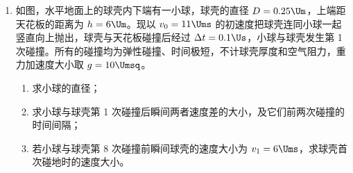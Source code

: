 \documentclass[\gkver]{gaokaozhenti}
\begin{document}
\begin{enumerate}
{离子进入反射电场，沿电场方向分速度 $v_{\parallel}=v\cos\theta$

加速度大小 $a=\frac{qU_{2}}{md_{2}}$

离子在反射电场中垂直电场方向分速度 $v_{\perp}=v\sin\theta$

由于 $U_{2}>U_{1}$，则粒子在反射电场往返时间 $t_{3}=\frac{2v_{\parallel}}{a}=\frac{2d_{2}\cos\theta}{U_{2}}\sqrt{\frac{2mU_{1}}{q}}$

可得垂直电场方向位移 $y=v_{\perp}t_{3}=\frac{4U_{1}d_{2}\sin\theta\cos\theta}{U_{2}}$

与离子比荷无关，结合沿电场方向最大位移与比荷无关，可得出所有正离子均从同一点射出反射电场。

（2）在加速电场中，根据位移时间关系 $d_{1}=\frac{1}{2}a't_{1}^{2}$

其中 $a'=\frac{qU_{1}}{md_{1}}$

可得加速电场中运动时间 $t_{1}=d_{1}\sqrt{\frac{2m}{qU_{1}}}$

无场区运动时间 $t_{2}=\frac{s_{0}}{v}=s_{0}\sqrt{\frac{m}{2qU_{1}}}$

离子从 O 到射出反射电场所用时间 $t=t_{1}+t_{2}+t_{3}=d_{1}\sqrt{\frac{2m}{qU_{1}}}+s_{0}\sqrt{\frac{m}{2qU_{1}}}+\frac{2d_{2}\cos\theta}{U_{2}}\sqrt{\frac{2mU_{1}}{q}}$

可知 $t\propto\sqrt{\frac{m}{q}}$，即 $\frac{\tau_{1}}{\tau_{2}}=\sqrt{\frac{\alpha_{2}}{\alpha_{1}}}$

可得 $\frac{\alpha_{1}}{\alpha_{2}}=\frac{9}{4}$
}

\item
如图，水平地面上的球壳内下端有一小球，球壳的直径 $D=0.25\Um$，上端距天花板的距离为 $h=6\Um$。现以 $v_{0}=11\Ums$ 的初速度把球壳连同小球一起竖直向上抛出，球壳与天花板碰撞后经过 $\Delta t=0.1\Us$，小球与球壳发生第 1 次碰撞。所有的碰撞均为弹性碰撞、时间极短，不计球壳厚度和空气阻力，重力加速度大小取 $g=10\Umsq$。
\begin{enumerate}
	\item
	求小球的直径；
	\item
	求小球与球壳第 1 次碰撞后瞬间两者速度差的大小，及它们前两次碰撞的时间间隔；
	\item
	若小球与球壳第 8 次碰撞前瞬间球壳的速度大小为 $v_{1}=6\Ums$，求球壳首次碰地时的速度大小。
\end{enumerate}
\onepicture[w=3.5cm, align=right]{}


\end{enumerate}
\end{document}
